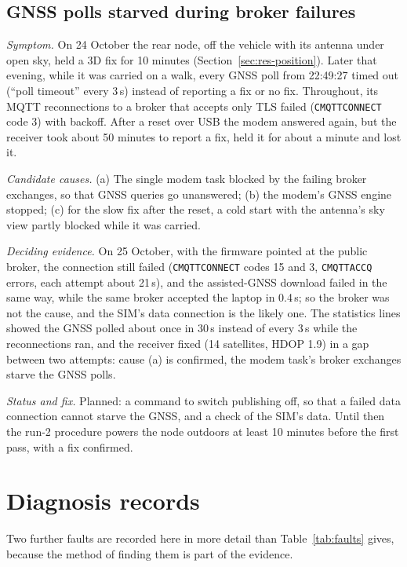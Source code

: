 \subsection{GNSS polls starved during broker failures}
\label{sec:inv-gnss-hang}

\emph{Symptom.} On 24 October the rear node, off the vehicle with its antenna under open sky, held a 3D fix for 10 minutes (Section~\ref{sec:res-position}). Later that evening, while it was carried on a walk, every GNSS poll from 22:49:27 timed out (``poll timeout'' every 3\,s) instead of reporting a fix or no fix. Throughout, its MQTT reconnections to a broker that accepts only TLS failed (\texttt{CMQTTCONNECT} code 3) with backoff. After a reset over USB the modem answered again, but the receiver took about 50 minutes to report a fix, held it for about a minute and lost it.

\emph{Candidate causes.} (a) The single modem task blocked by the failing broker exchanges, so that GNSS queries go unanswered; (b) the modem's GNSS engine stopped; (c) for the slow fix after the reset, a cold start with the antenna's sky view partly blocked while it was carried.

\emph{Deciding evidence.} On 25 October, with the firmware pointed at the public broker, the connection still failed (\texttt{CMQTTCONNECT} codes 15 and 3, \texttt{CMQTTACCQ} errors, each attempt about 21\,s), and the assisted-GNSS download failed in the same way, while the same broker accepted the laptop in 0.4\,s; so the broker was not the cause, and the SIM's data connection is the likely one. The statistics lines showed the GNSS polled about once in 30\,s instead of every 3\,s while the reconnections ran, and the receiver fixed (14 satellites, HDOP 1.9) in a gap between two attempts: cause (a) is confirmed, the modem task's broker exchanges starve the GNSS polls.

\emph{Status and fix.} Planned: a command to switch publishing off, so that a failed data connection cannot starve the GNSS, and a check of the SIM's data. Until then the run-2 procedure powers the node outdoors at least 10 minutes before the first pass, with a fix confirmed.

\section{Diagnosis records}
\label{sec:diagnoses}

Two further faults are recorded here in more detail than Table~\ref{tab:faults} gives, because the method of finding them is part of the evidence.

